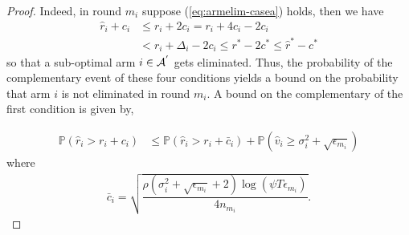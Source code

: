 \begin{proof}
Indeed, in round $m_i$ suppose (\ref{eq:armelim-casea}) holds, then we have
%	 
  \begin{align*}
\hat{r}_{i} + c_{i}&\leq r_{i} + 2c_{i} 
= r_{i} + 4c_{i} - 2c_{i} \\
 &< r_{i} + \Delta_{i} - 2c_{i}
 \leq r^{*} -2c^{*} 
 \leq \hat{r}^{*} - c^{*}
  \end{align*}
  so that a sub-optimal arm ${i} \in \mathcal{A}^{'}$ gets eliminated.	
Thus, the probability of the complementary event of these four conditions yields a bound on the probability that arm $i$ is not eliminated in round $m_i$. A bound on the complementary of the first condition is given by,

\begin{align}
\mathbb{P}(\hat{r}_{i}> r_{i} + c_{i})
&\leq \mathbb{P}\left( \hat{r}_{i} > r_{i}+ \bar{c}_i\right) 
+ \mathbb{P}\left( \hat{v}_{i}\geq \sigma_{i}^{2}+\sqrt{\epsilon_{m_{i}}}\right)\label{eq:prob_eq2}
\end{align}
where 
\begin{align*}
\bar{c}_i=\sqrt{\dfrac{\rho (\sigma_{i}^{2}+\sqrt{\epsilon_{m_{i}}} + 2)\log(\psi T\epsilon_{m_{i}})}{4n_{m_i}}}.
\end{align*}


\end{proof}
